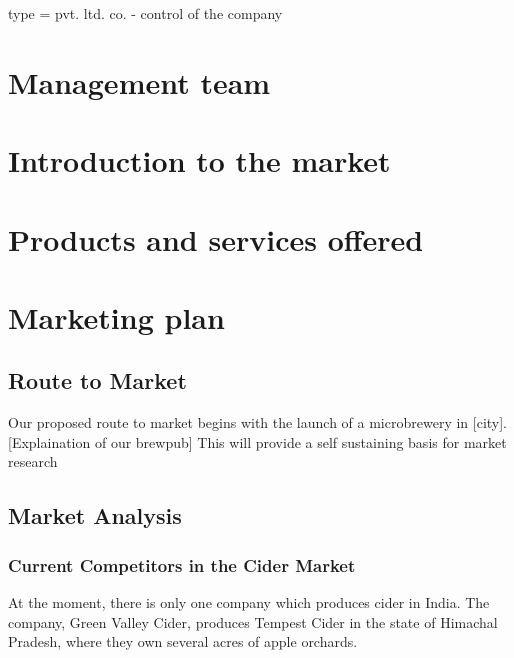 \documentclass{article}
\begin{document}
type = pvt. ltd. co. - control of the company
\newpage
\section{Management team}
\newpage
\section{Introduction to the market}
\newpage
\section{Products and services offered}
\newpage
\section{Marketing plan}

\subsection{Route to Market}
Our proposed route to market begins with the launch of a microbrewery in [city].
[Explaination of our brewpub]
This will provide a self sustaining basis for market research


\subsection{Market Analysis}
\subsubsection{Current Competitors in the Cider Market}
At the moment, there is only one company which produces cider in India.
The company, Green Valley Cider, produces Tempest Cider in the state of Himachal
Pradesh, where they own several acres of apple orchards.
\end{document}
